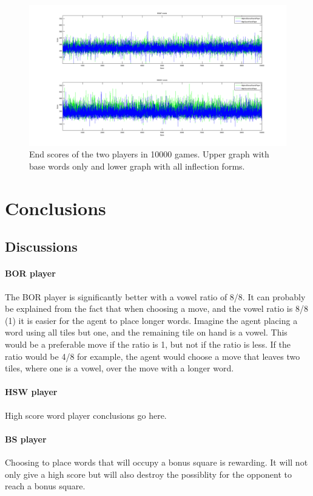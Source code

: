 \documentclass[a4paper, 12pt]{report}
\begin{document}
\begin{figure}[h]
\centering
\includegraphics[scale=0.45]{Highest_Bonus_Round_vs_High_Score_Word_10000}
\caption {End scores of the two players in 10000 games. Upper graph with base words only and lower graph with all inflection forms.}
\label{fig:bs+hsw+totalscores}
\end{figure}

\chapter{Conclusions}
\section{Discussions}
\subsubsection{BOR player}
The BOR player is significantly better with a vowel ratio of 8/8. It can probably be explained from the fact that when choosing a move, and the vowel ratio is 8/8 (1) it is easier for the agent to place longer words. Imagine the agent placing a word using all tiles but one, and the remaining tile on hand is a vowel. This would be a preferable move if the ratio is 1, but not if the ratio is less. If the ratio would be 4/8 for example, the agent would choose a move that leaves two tiles, where one is a vowel, over the move with a longer word. 

\subsubsection{HSW player}
High score word player conclusions go here.

\subsubsection{BS player}
Choosing to place words that will occupy a bonus square is rewarding. It will not only give a high score but will also destroy the possiblity for the opponent to reach a bonus square.
\end{document}
